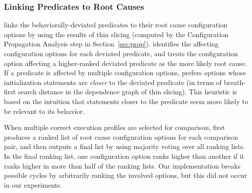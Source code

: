 





\subsubsection{Linking Predicates to Root Causes}
\label{sec:linking}


\ourtool links the behaviorally-deviated
predicates to their root cause configuration options
by using the results of thin slicing (computed by the Configuration Propagation
Analysis step in Section~\ref{sec:prop}).
\ourtool identifies 
the affecting configuration options for each deviated predicate,
and treats the configuration option
affecting a higher-ranked deviated predicate as the more likely
root cause. If a predicate is affected by multiple
configuration options, \ourtool prefers options whose initialization
statements are \textit{closer} to the
deviated predicate (in terms of breath-first search
distance in the dependence graph of thin slicing).
This heuristic is based on the intuition that statements closer to the
predicate seem more likely to be relevant to its behavior.



When multiple correct execution profiles are selected for comparison,
\ourtool first produces a ranked list of root cause
configuration options for each comparison pair, and then outputs
a final list by using majority voting over all ranking lists.
In the final ranking list, one configuration option ranks higher
than another if it ranks higher in more than half of the ranking lists.
Our implementation breaks possible cycles by arbitrarily ranking the
involved options, but this did not occur in our experiments. 

